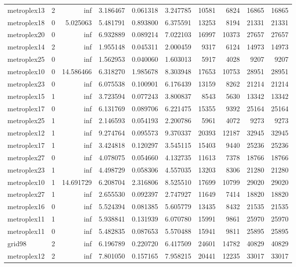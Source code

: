 \begin{longtable}{|l|r|r|r|r|r|r|r|r|r|}
metroplex13 & 2 & inf & 3.186467 & 0.061318 & 3.247785 & 10581 & 6824 & 16865 & 16865 \\
metroplex18 & 0 & 5.025063 & 5.481791 & 0.893800 & 6.375591 & 13253 & 8194 & 21331 & 21331 \\
metroplex20 & 0 & inf & 6.932889 & 0.089214 & 7.022103 & 16997 & 10373 & 27657 & 27657 \\
metroplex14 & 2 & inf & 1.955148 & 0.045311 & 2.000459 & 9317 & 6124 & 14973 & 14973 \\
metroplex25 & 0 & inf & 1.562953 & 0.040060 & 1.603013 & 5917 & 4028 & 9207 & 9207 \\
metroplex10 & 0 & 14.586466 & 6.318270 & 1.985678 & 8.303948 & 17653 & 10753 & 28951 & 28951 \\
metroplex23 & 0 & inf & 6.075538 & 0.100901 & 6.176439 & 13159 & 8262 & 21214 & 21214 \\
metroplex15 & 1 & inf & 3.723594 & 0.077243 & 3.800837 & 8543 & 5630 & 13342 & 13342 \\
metroplex17 & 0 & inf & 6.131769 & 0.089706 & 6.221475 & 15355 & 9392 & 25164 & 25164 \\
metroplex25 & 1 & inf & 2.146593 & 0.054193 & 2.200786 & 5961 & 4072 & 9273 & 9273 \\
metroplex12 & 1 & inf & 9.274764 & 0.095573 & 9.370337 & 20393 & 12187 & 32945 & 32945 \\
metroplex17 & 1 & inf & 3.424818 & 0.120297 & 3.545115 & 15403 & 9440 & 25236 & 25236 \\
metroplex27 & 0 & inf & 4.078075 & 0.054660 & 4.132735 & 11613 & 7378 & 18766 & 18766 \\
metroplex23 & 1 & inf & 4.498729 & 0.058306 & 4.557035 & 13203 & 8306 & 21280 & 21280 \\
metroplex10 & 1 & 14.691729 & 6.208704 & 2.316806 & 8.525510 & 17699 & 10799 & 29020 & 29020 \\
metroplex27 & 1 & inf & 2.655530 & 0.092397 & 2.747927 & 11649 & 7414 & 18820 & 18820 \\
metroplex16 & 0 & inf & 5.524394 & 0.081385 & 5.605779 & 13435 & 8432 & 21535 & 21535 \\
metroplex11 & 1 & inf & 5.938841 & 0.131939 & 6.070780 & 15991 & 9861 & 25970 & 25970 \\
metroplex11 & 0 & inf & 5.482835 & 0.087653 & 5.570488 & 15941 & 9811 & 25895 & 25895 \\
grid98 & 2 & inf & 6.196789 & 0.220720 & 6.417509 & 24601 & 14782 & 40829 & 40829 \\
metroplex12 & 2 & inf & 7.801050 & 0.157165 & 7.958215 & 20441 & 12235 & 33017 & 33017 \\

\end{longtable}
